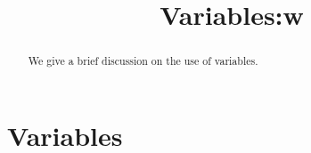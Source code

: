 \documentclass{ximera}
\title{Variables:w}
\begin{document}
  
\begin{abstract}  
We give a brief discussion on the use of variables.
\end{abstract}  
\maketitle

\section{Variables}



\begin{problem}
\end{problem}

\begin{problem}
\end{problem}
\end{document}
